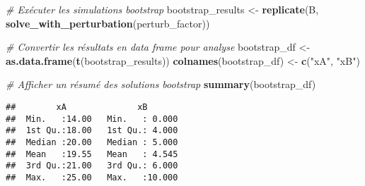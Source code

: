 \documentclass[
]{article}
\newenvironment{Shaded}{\begin{snugshade}}{\end{snugshade}}
\newcommand{\CommentTok}[1]{\textcolor[rgb]{0.56,0.35,0.01}{\textit{#1}}}
\newcommand{\FunctionTok}[1]{\textcolor[rgb]{0.13,0.29,0.53}{\textbf{#1}}}
\newcommand{\NormalTok}[1]{#1}
\newcommand{\OtherTok}[1]{\textcolor[rgb]{0.56,0.35,0.01}{#1}}
\newcommand{\StringTok}[1]{\textcolor[rgb]{0.31,0.60,0.02}{#1}}
\begin{document}
\begin{Shaded}
\begin{Highlighting}[]
\CommentTok{\# Exécuter les simulations bootstrap}
\NormalTok{bootstrap\_results }\OtherTok{\textless{}{-}} \FunctionTok{replicate}\NormalTok{(B, }\FunctionTok{solve\_with\_perturbation}\NormalTok{(perturb\_factor))}

\CommentTok{\# Convertir les résultats en data frame pour analyse}
\NormalTok{bootstrap\_df }\OtherTok{\textless{}{-}} \FunctionTok{as.data.frame}\NormalTok{(}\FunctionTok{t}\NormalTok{(bootstrap\_results))}
\FunctionTok{colnames}\NormalTok{(bootstrap\_df) }\OtherTok{\textless{}{-}} \FunctionTok{c}\NormalTok{(}\StringTok{"xA"}\NormalTok{, }\StringTok{"xB"}\NormalTok{)}

\CommentTok{\# Afficher un résumé des solutions bootstrap}
\FunctionTok{summary}\NormalTok{(bootstrap\_df)}
\end{Highlighting}
\end{Shaded}

\begin{verbatim}
##        xA              xB        
##  Min.   :14.00   Min.   : 0.000  
##  1st Qu.:18.00   1st Qu.: 4.000  
##  Median :20.00   Median : 5.000  
##  Mean   :19.55   Mean   : 4.545  
##  3rd Qu.:21.00   3rd Qu.: 6.000  
##  Max.   :25.00   Max.   :10.000
\end{verbatim}
\end{document}
